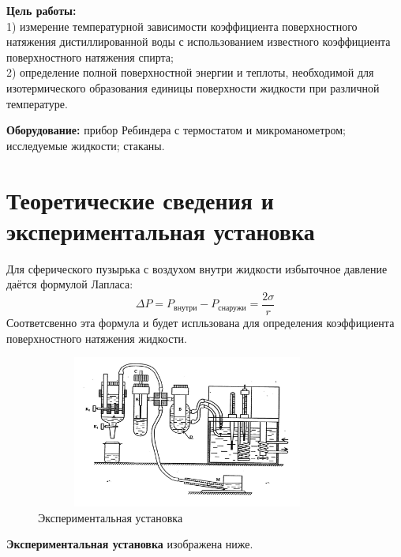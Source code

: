 \textbf{Цель работы:}\\1) измерение температурной зависимости  
коэффициента поверхностного натяжения дистиллированной воды с использованием 
известного коэффициента поверхностного натяжения спирта;  
\\2) определение полной поверхностной энергии  и теплоты, необходимой 
для изотермического образования единицы  поверхности жидкости  при различной 
температуре. \\\indent

\textbf{Оборудование:} прибор  Ребиндера  с термостатом и 
микроманометром; исследуемые жидкости; стаканы.

\section*{Теоретические сведения и экспериментальная установка}
\normalsize{Для сферического пузырька с воздухом  внутри жидкости 
избыточное давление даётся формулой Лапласа:}
\begin{equation}
    \Delta P = P_{\text{внутри}} - P_{\text{снаружи}} = \frac{2\sigma}{r}
\end{equation}
\normalsize{Соответсвенно эта формула и будет испльзована для определения
коэффициента поверхностного натяжения жидкости.}

\begin{figure}[b]
    \centering
    \includegraphics[height=5cm, width=10cm]{установка.jpg}
    \caption{Экспериментальная установка}
    \label{fig:experiment}
\end{figure}
\textbf{Экспериментальная установка} изображена ниже. 

